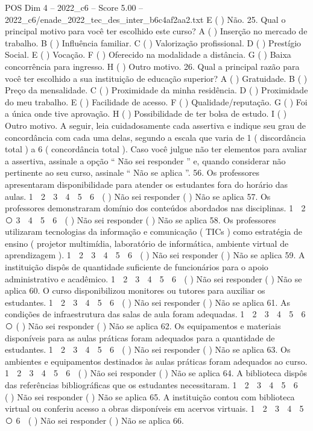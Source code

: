 \begin{textsample}{POS Dim 4 – 2022\_c6 – Score 5.00 – 2022\_c6/enade\_2022\_tec\_des\_inter\_b6c4af2aa2.txt}
E ( ) Não. 25.
Qual o principal motivo para você ter escolhido este curso?
A ( ) Inserção no mercado de trabalho.
B ( ) Influência familiar.
C ( ) Valorização profissional.
D ( ) Prestígio Social.
E ( ) Vocação.
F ( ) Oferecido na modalidade a distância.
G ( ) Baixa concorrência para ingresso.
H ( ) Outro motivo. 26.
Qual a principal razão para você ter escolhido a sua instituição de educação superior?
A ( ) Gratuidade.
B ( ) Preço da mensalidade.
C ( ) Proximidade da minha residência.
D ( ) Proximidade do meu trabalho.
E ( ) Facilidade de acesso.
F ( ) Qualidade/reputação.
G ( ) Foi a única onde tive aprovação.
H ( ) Possibilidade de ter bolsa de estudo.
I ( ) Outro motivo.
A seguir, leia cuidadosamente cada assertiva e indique seu grau de concordância com cada uma delas, segundo a escala que varia de 1 ( discordância total ) a 6 ( concordância total ).
Caso você julgue não ter elementos para avaliar a assertiva, assinale a opção “ Não sei responder ” e, quando considerar não pertinente ao seu curso, assinale “ Não se aplica ”. 56.
Os professores apresentaram disponibilidade para atender os estudantes fora do horário das aulas. 1 ⃝ 2 ⃝ 3 ⃝ 4 ⃝ 5 ⃝ 6 ⃝ ( ) Não sei responder ( ) Não se aplica 57.
Os professores demonstraram domínio dos conteúdos abordados nas disciplinas. 1 ⃝ 2 ⃝ 3 ⃝ 4 ⃝ 5 ⃝ 6 ⃝ ( ) Não sei responder ( ) Não se aplica 58.
Os professores utilizaram tecnologias da informação e comunicação ( TICs ) como estratégia de ensino ( projetor multimídia, laboratório de informática, ambiente virtual de aprendizagem ). 1 ⃝ 2 ⃝ 3 ⃝ 4 ⃝ 5 ⃝ 6 ⃝ ( ) Não sei responder ( ) Não se aplica 59.
A instituição dispôs de quantidade suficiente de funcionários para o apoio administrativo e acadêmico. 1 ⃝ 2 ⃝ 3 ⃝ 4 ⃝ 5 ⃝ 6 ⃝ ( ) Não sei responder ( ) Não se aplica 60.
O curso disponibilizou monitores ou tutores para auxiliar os estudantes. 1 ⃝ 2 ⃝ 3 ⃝ 4 ⃝ 5 ⃝ 6 ⃝ ( ) Não sei responder ( ) Não se aplica 61.
As condições de infraestrutura das salas de aula foram adequadas. 1 ⃝ 2 ⃝ 3 ⃝ 4 ⃝ 5 ⃝ 6 ⃝ ( ) Não sei responder ( ) Não se aplica 62.
Os equipamentos e materiais disponíveis para as aulas práticas foram adequados para a quantidade de estudantes. 1 ⃝ 2 ⃝ 3 ⃝ 4 ⃝ 5 ⃝ 6 ⃝ ( ) Não sei responder ( ) Não se aplica 63.
Os ambientes e equipamentos destinados às aulas práticas foram adequados ao curso. 1 ⃝ 2 ⃝ 3 ⃝ 4 ⃝ 5 ⃝ 6 ⃝ ( ) Não sei responder ( ) Não se aplica 64.
A biblioteca dispôs das referências bibliográficas que os estudantes necessitaram. 1 ⃝ 2 ⃝ 3 ⃝ 4 ⃝ 5 ⃝ 6 ⃝ ( ) Não sei responder ( ) Não se aplica 65.
A instituição contou com biblioteca virtual ou conferiu acesso a obras disponíveis em acervos virtuais. 1 ⃝ 2 ⃝ 3 ⃝ 4 ⃝ 5 ⃝ 6 ⃝ ( ) Não sei responder ( ) Não se aplica 66.

\end{textsample}
